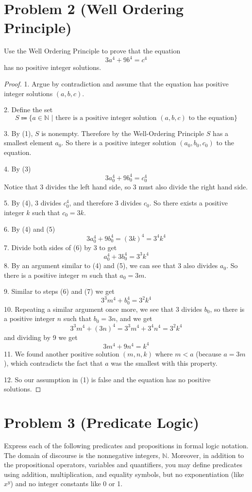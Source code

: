 \documentclass[14pt]{extarticle}
\begin{document}
\section{Problem 2 (Well Ordering Principle)}
Use the Well Ordering Principle to prove that the equation
$$
3a^4 + 9b^4 = c^4
$$
has no positive integer solutions.
\begin{proof}
1. Argue by contradiction and assume that the equation has positive integer solutions $(a,b,c)$. 

2. Define the set
$$
S \Coloneqq \{a \in \mathbb{N} \,\,|\,\,\text{there is a positive integer solution }(a,b,c) \text{ to the equation}\}
$$

3. By (1), $S$ is nonempty. Therefore by the Well-Ordering Principle $S$ has a smallest element $a_0$. So there is a positive integer solution $(a_0, b_0, c_0)$ to the equation.

4. By (3) 
$$
3a_0^4 + 9b_0^4 = c_0^4
$$ 
Notice that 3 divides the left hand side, so 3 must also divide the right hand side.

5. By (4), 3 divides $c_0^4$, and therefore 3 divides $c_0$. So there exists a positive integer $k$ such that $c_0 = 3k$.

6. By (4) and (5)
$$
3a_0^4 + 9b_0^4 = (3k)^4 = 3^4k^4
$$
7. Divide both sides of (6) by 3 to get
$$
a_0^4 + 3b_0^4 = 3^3k^4
$$
8. By an argument similar to (4) and (5), we can see that 3 also divides $a_0$. So there is a positive integer $m$ such that $a_0 = 3m$.

9. Similar to steps (6) and (7) we get
$$
3^3m^4 + b_0^4 = 3^2k^4
$$
10. Repeating a similar argument once more, we see that 3 divides $b_0$, so there is a positive integer $n$ such that $b_0 = 3n$, and we get
$$
3^3m^4 + (3n)^4 = 3^3m^4 + 3^4n^4 = 3^2k^4
$$
and dividing by 9 we get
$$
3m^4 + 9n^4 = k^4
$$
11. We found another positive solution $(m, n, k)$ where $m < a$ (because $a = 3m$), which contradicts the fact that $a$ was the smallest with this property. 

12. So our assumption in (1) is false and the equation has no positive solutions.
\end{proof}

\section{Problem 3 (Predicate Logic)}
Express each of the following predicates and propositions in formal logic notation. The domain of discourse is the nonnegative integers, $\mathbb{N}$. Moreover, in addition to the propositional operators, variables and quantifiers, you may define predicates using addition, multiplication, and equality symbols, but no exponentiation (like
$x^y$) and no integer constants like 0 or 1.
\end{document}
